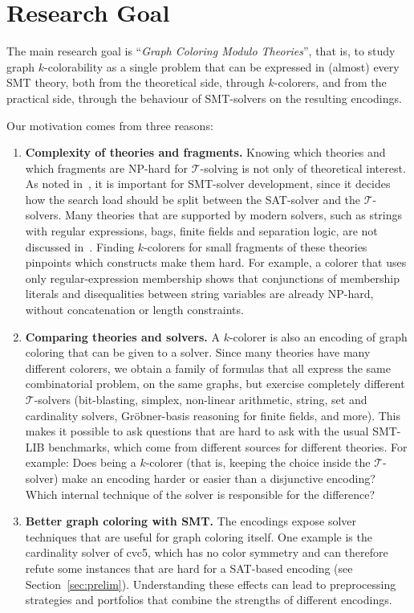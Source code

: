 \documentclass[12pt,a4paper]{article}
\newcommand{\T}{\mathcal{T}}
\theoremstyle{definition}
\begin{document}
\section{Research Goal}

The main research goal is ``\emph{Graph Coloring Modulo Theories}'', that is, to
study graph $k$-colorability as a single problem that can be expressed in (almost) every
SMT theory, both from the theoretical side, through $k$-colorers, and from the
practical side, through the behaviour of SMT-solvers on the resulting encodings.

Our motivation comes from three reasons:
\begin{enumerate}
  \item \textbf{Complexity of theories and fragments.} Knowing which theories and
    which fragments are NP-hard for $\T$-solving is not only of theoretical
    interest. As noted in~\cite{Sebastiani16}, it is important for SMT-solver
    development, since it decides how the search load should be split between the
    SAT-solver and the $\T$-solvers. Many theories that are supported by modern
    solvers, such as strings with regular expressions, bags, finite fields and
    separation logic, are not discussed in~\cite{Sebastiani16}. Finding $k$-colorers
    for small fragments of these theories pinpoints which constructs make them hard.
    For example, a colorer that uses only regular-expression membership shows that
    conjunctions of membership literals and disequalities between string variables
    are already NP-hard, without concatenation or length constraints.

  \item \textbf{Comparing theories and solvers.} A $k$-colorer is also an encoding
    of graph coloring that can be given to a solver. Since many theories have many
    different colorers, we obtain a family of formulas that all express the same
    combinatorial problem, on the same graphs, but exercise completely different
    $\T$-solvers (bit-blasting, simplex, non-linear arithmetic, string, set and
    cardinality solvers, Gr\"obner-basis reasoning for finite fields, and more).
    This makes it possible to ask questions that are hard to ask with
    the usual SMT-LIB benchmarks, which come from different sources for different
    theories. For example: Does being a $k$-colorer (that is, keeping the choice
    inside the $\T$-solver) make an encoding harder or easier than a disjunctive
    encoding? Which internal technique of the solver is responsible for the
    difference?

  \item \textbf{Better graph coloring with SMT.} The encodings expose solver
    techniques that are useful for graph coloring itself. One example is the
    cardinality solver of cvc5, which has no color symmetry and can therefore
    refute some instances that are hard for a SAT-based encoding (see
    Section~\ref{sec:prelim}). Understanding these effects can lead to
    preprocessing strategies and portfolios that combine the strengths of different
    encodings.
\end{enumerate}
\end{document}
